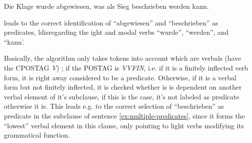 \begin{examples}
	\label{ex:multiple-predicates}
	\item Die Klage wurde abgewiesen, was als Sieg beschrieben werden kann.
\end{examples}

leads to the correct identification of ``abgewiesen'' and ``beschrieben'' as predicates,
ldisregarding the ight and modal verbs ``wurde'', ``werden'', and ``kann'.


Basically, the algorithm only takes tokens into account which are verbals (have the CPOSTAG
\emph{V}) ; if the POSTAG is \emph{VVFIN}, i.e. if it is a finitely inflected verb form, it is
right away considered to be a predicate. Otherwise, if it is a verbal form but not finitely
inflected, it is checked whether is is dependent on another verbal element of it's subclause,
if this is the case, it's not labeled as predicate otherwise it is. This leads e.g. to the
correct selection of ``beschrieben'' as predicate in the subclause of sentence \ref{ex:multiple-predicates},
since it forms the ``lowest'' verbal element in this clause, only pointing to light verbs modifying
its grammatical function.




